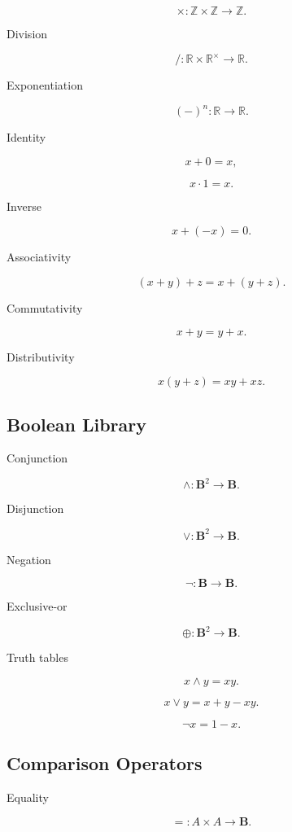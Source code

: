 \documentclass[12pt,oneside]{article}
\theoremstyle{definition}
\theoremstyle{remark}
\begin{document}
\[
\times
:
\mathbb Z
\times
\mathbb Z
\rightarrow
\mathbb Z.
\]

Division

\[
/
:
\mathbb R
\times
\mathbb R^\times
\rightarrow
\mathbb R.
\]

Exponentiation

\[
(-)^n
:
\mathbb R
\rightarrow
\mathbb R.
\]

Identity

\[
x+0=x,
\]

\[
x\cdot1=x.
\]

Inverse

\[
x+(-x)=0.
\]

Associativity

\[
(x+y)+z=x+(y+z).
\]

Commutativity

\[
x+y=y+x.
\]

Distributivity

\[
x(y+z)=xy+xz.
\]

\subsection*{Boolean Library}

Conjunction

\[
\land
:
\mathbf B^2
\rightarrow
\mathbf B.
\]

Disjunction

\[
\lor
:
\mathbf B^2
\rightarrow
\mathbf B.
\]

Negation

\[
\neg
:
\mathbf B
\rightarrow
\mathbf B.
\]

Exclusive-or

\[
\oplus
:
\mathbf B^2
\rightarrow
\mathbf B.
\]

Truth tables

\[
x\land y
=
xy.
\]

\[
x\lor y
=
x+y-xy.
\]

\[
\neg x
=
1-x.
\]

\subsection*{Comparison Operators}

Equality

\[
=
:
A
\times
A
\rightarrow
\mathbf B.
\]
\end{document}
